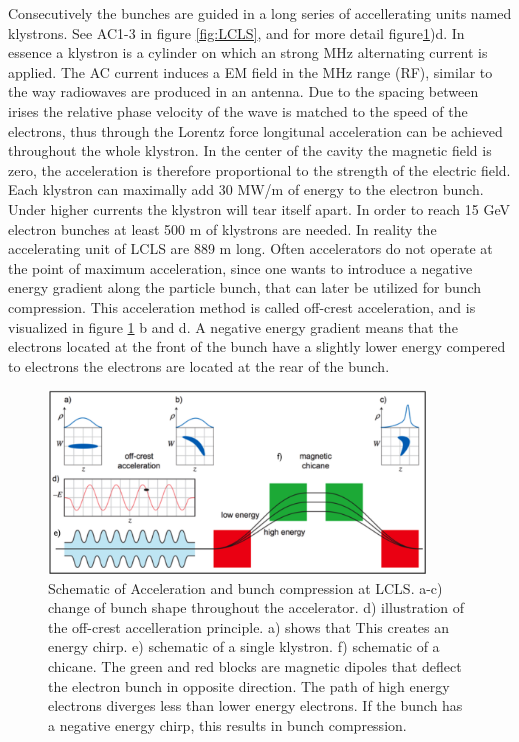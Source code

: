 Consecutively the bunches are guided in a long series of accellerating units named klystrons. See AC1-3 in figure \ref{fig:LCLS}, and for more detail figure\ref{fig:AC})d. In essence a klystron is a cylinder on which an strong MHz alternating current is applied. The AC current induces a EM field in the MHz range (RF), similar to the way radiowaves are produced in an antenna. Due to the spacing between irises the relative phase velocity of the wave is matched to the speed of the electrons, thus through the Lorentz force longitunal acceleration can be achieved throughout the whole klystron. In the center of the cavity the magnetic field is zero, the acceleration is therefore proportional to the strength of the electric field. Each klystron can maximally add 30 MW/m of energy to the electron bunch. Under higher currents the klystron will tear itself apart. In order to reach 15 GeV electron bunches at least 500 m of klystrons are needed. In reality the accelerating unit of LCLS are 889 m long. Often accelerators do not operate at the point of maximum acceleration, since one wants to introduce a negative energy gradient along the particle bunch, that can later be utilized for bunch compression. This acceleration method is called off-crest acceleration, and is visualized in figure  \ref{fig:AC} b and d. A negative energy gradient means that the electrons located at the front of the bunch have a slightly lower energy compered to electrons the electrons are located at the rear of the bunch.

\begin{figure}[h]\label{fig:AC}
\centering
\includegraphics[width=100mm]{acceleration.png}
\caption{Schematic of Acceleration and bunch compression at LCLS. a-c) change of bunch shape throughout the accelerator. d) illustration of the off-crest accelleration principle. a) shows that  This creates an energy chirp. e) schematic of a single klystron. f) schematic of a chicane. The green and red blocks are magnetic dipoles that deflect the electron bunch in opposite direction. The path of high energy electrons diverges less than lower energy electrons. If the bunch has a negative energy chirp, this results in bunch compression.}
\end{figure}

